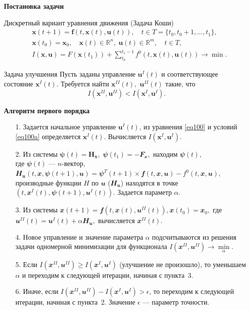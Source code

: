 \documentclass[10pt]{beamer}
\begin{document}
\begin{frame}{\textbf{Постановка задачи} }
\begin{block}{Дискретный вариант уравнения движения (Задача Коши)}
  \begin{align}
&\mathbf{x}(t+1)=\mathbf{f}(t,\mathbf{x}(t),\mathbf{u}(t)),\quad t \in T=\{t_0,t_0+1,...,t_1\},
	\label{eq100} \\
&\mathbf{x}(t_0)=\mathbf{x}_0,\quad \mathbf{x}(t)\in \mathbb{R}^n,\; \mathbf{u}(t) \in \mathbb{R}^m,\quad t\in T,\label{eq100a} \\
&I(\mathbf{x},\mathbf{u})=F(\mathbf{x}(t_1))+ \sum_{t_0}^{t_1-1}f^0(t,\mathbf{x}(t),\mathbf{u}(t)) \to \min.
  \label{eq103}
  \end{align}
\end{block}
\begin{block}{Задача улучшения}
  Пусть заданы управление $\mathbf{u}^I(t)$ и соответствующее состояние $\mathbf{x}^I(t)$. Требуется найти $\mathbf{x}^{I\!I}(t),$ $\mathbf{u}^{I\!I}(t)$ такие, что
\[
I(\mathbf{x}^{I\!I},\mathbf{u}^{I\!I}) < I(\mathbf{x}^I,\mathbf{u}^I).
\]
 \end{block}
\end{frame}
\def\H{\mathbfit{H}}
\def\x{\mathbfit{x}}
\def\u{\mathbfit{u}}
\def\f{\mathbfit{f}}
\def\F{\mathbfit{F}}
\def\bpsi{\mathbfit{\psi}}
\begin{frame}[shrink]{\textbf{Алгоритм первого порядка} }
\begin{enumerate}
 \item[1.] Задается начальное управление $\mathbf{u}^I(t)$, из уравнения \eqref{eq100} и условий \eqref{eq100a} определяется $\mathbf{x}^I(t)$. Вычисляется $I(\mathbf{x}^I,\mathbf{u}^I).$
 \item[2.] Из системы $\mathbf{\psi}(t)=\mathbf{H}_\mathbf{x},\;\bpsi(t_1)=-\F_\x,$ находим $\bpsi(t),$\\ где $\bpsi(t)$ --- $n$-вектор, $\H_\u(t,\x,\bpsi(t+1),\u)=\bpsi^{T}(t+1)\times\f(t,\x,\u)-f^{0}(t,\x,\u),$ производные функции $H$ по $\u$ ($\H_\u$) находятся в точке $\left(t,\x^{I}(t),\bpsi \left(t+1 \right),\u^{I}(t)\right)$. Задается параметр $\alpha$.
 \item[3.] Из системы $\x(t+1)=\f(t,\x(t),\u^{I\!I}(t)), \x(t_0)=\x_0,$ где $\u^{I\!I}(t)=\u^{I}(t)+\alpha \H_\u,$ вычисляется $\x^{I\!I}(t).$
 \item[4.] Новое управление и значение параметра $\alpha$ подсчитываются из решения задачи одномерной минимизации для функционала $I(\x^{I\!I},\u^{I\!I})\to \min\limits_{\alpha}.$
 \item[5.] Если $I\left(\x^{I\!I},\u^{I\!I}\right)\geq I\left(\x^{I},\u^{I}\right)$ (улучшение не произошло), то уменьшаем $\alpha$ и переходим к следующей итерации, начиная с пункта~3.
 \item[6.] Иначе, если $I\left(\x^{I\!I},\u^{I\!I}\right) - I\left(\x^{I},\u^{I}\right)>\epsilon$, то переходим к следующей итерации, начиная с пункта~2. Значение $\epsilon$ --- параметр точности.
\end{enumerate}
\end{frame}
\end{document}
